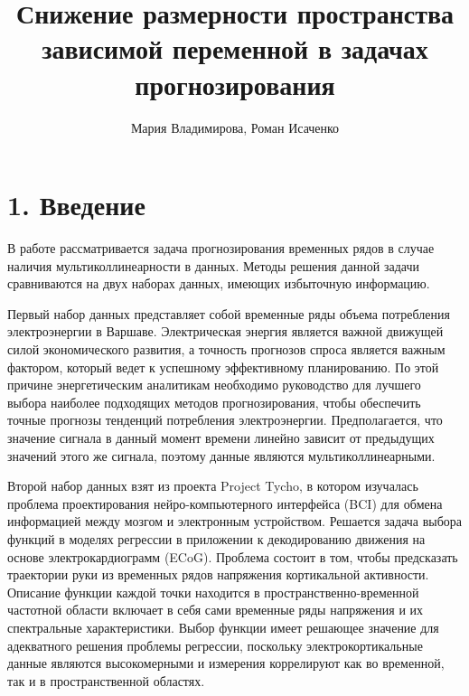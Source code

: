 \documentclass[12pt,twoside]{article}
\title
	{Снижение размерности пространства зависимой переменной в задачах прогнозирования}
\author
	{Мария Владимирова, Роман Исаченко}
\begin{document}
\maketitle


\linenumbers
\section{1. Введение}
В работе рассматривается задача прогнозирования временных рядов в случае наличия мультиколлинеарности в данных. Методы решения данной задачи сравниваются на двух наборах данных, имеющих избыточную информацию. 

Первый набор данных представляет собой временные ряды объема потребления электроэнергии в Варшаве. 
Электрическая энергия является важной движущей силой экономического развития, а точность прогнозов спроса является важным фактором, который ведет к успешному эффективному планированию. 
По этой причине энергетическим аналитикам необходимо руководство для лучшего выбора наиболее подходящих методов прогнозирования, чтобы обеспечить точные прогнозы тенденций потребления электроэнергии.
Предполагается, что значение сигнала в данный момент времени линейно зависит от предыдущих значений этого же сигнала, поэтому данные являются мультиколлинеарными.  


Второй набор данных взят из проекта Project Tycho, в котором изучалась проблема проектирования нейро-компьютерного интерфейса (BCI) для обмена информацией между мозгом и электронным устройством. Решается задача выбора функций в моделях регрессии в приложении к декодированию движения на основе электрокардиограмм (ECoG). 
Проблема состоит в том, чтобы предсказать траектории руки из временных рядов напряжения кортикальной активности. Описание функции каждой точки находится в пространственно-временной частотной области включает в себя сами временные ряды напряжения и их спектральные характеристики. Выбор функции имеет решающее значение для адекватного решения проблемы регрессии, поскольку электрокортикальные данные являются высокомерными и измерения коррелируют как во временной, так и в пространственной областях.
\end{document}
